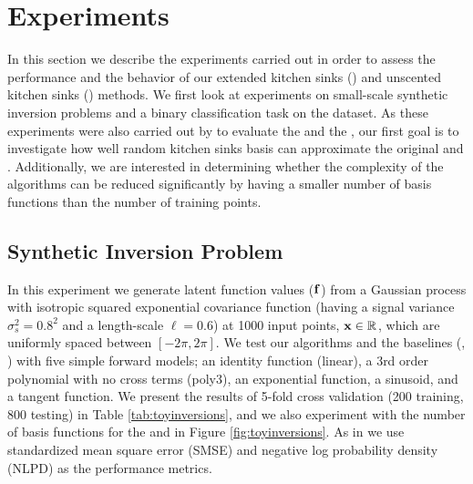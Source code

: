 \section{Experiments}
%
In this section we describe the experiments carried out in order to assess 
the performance and the behavior of our extended kitchen sinks (\eks) and 
unscented kitchen sinks (\uks) methods. We first look at experiments on 
small-scale synthetic inversion problems and a binary classification task on 
the \usps dataset. As these experiments were also carried out by 
\citet{steinberg-bonilla-nips-2014} to evaluate the \egp and the \ugp, 
our first goal  is to investigate how well 
random kitchen sinks basis can approximate the original \egp and \ugp.
Additionally, we are interested in determining whether the complexity 
of the algorithms  can be reduced significantly by having a smaller number 
of basis functions than the number of training points.
%
\subsection{Synthetic Inversion Problem}
In this experiment we generate latent function values ($\mathbf{f}$) from a
Gaussian process with isotropic squared exponential covariance function (having
a signal variance  $\sigma^2_s = 0.8^2$ and a length-scale $\ell = 0.6$) at
1000 input points, $\mathbf{x} \in \mathbb{R}^{}$, which are uniformly spaced between
$[-2\pi, 2\pi]$. We test our algorithms and the baselines (\ugp, \egp) with
five simple forward models; an identity function (linear), a 3rd order
polynomial with no cross terms (poly3), an exponential function, a sinusoid,
and a tangent function. We present the results of 5-fold cross validation (200
training, 800 testing) in Table \ref{tab:toyinversions}, and we also experiment
with the number of basis functions for the \eks and \uks in
Figure \ref{fig:toyinversions}. As in \citet{steinberg-bonilla-nips-2014} we
use standardized mean square error (SMSE) and negative log probability density
(NLPD) as the performance metrics. 
%
\begin{table}[t]
\caption{Performance of the \eks and \uks methods compared to their GP counterparts (\egp and \ugp) on a range of synthetic benchmarks when using $D=200$ features. The mean for each measure is shown and the
standard deviation in brackets. 
\label{tab:toyinversions}
}

\begin{center}
\begin{small}

\end{small}
\end{center}
\end{table}

